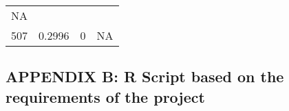 \documentclass[]{article}
\begin{document}
\begin{longtable}[]{@{}cccc@{}}
\begin{minipage}[t]{0.17\columnwidth}
NA\strut
\end{minipage}\tabularnewline
\begin{minipage}[t]{0.10\columnwidth}\centering\strut
507\strut
\end{minipage} & \begin{minipage}[t]{0.25\columnwidth}\centering\strut
0.2996\strut
\end{minipage} & \begin{minipage}[t]{0.17\columnwidth}\centering\strut
0\strut
\end{minipage} & \begin{minipage}[t]{0.17\columnwidth}\centering\strut
NA\strut
\end{minipage}\tabularnewline
\bottomrule
\end{longtable}

\newpage

\subsection{APPENDIX B: R Script based on the requirements of the
project}\label{appendix-b-r-script-based-on-the-requirements-of-the-project}
\end{document}
